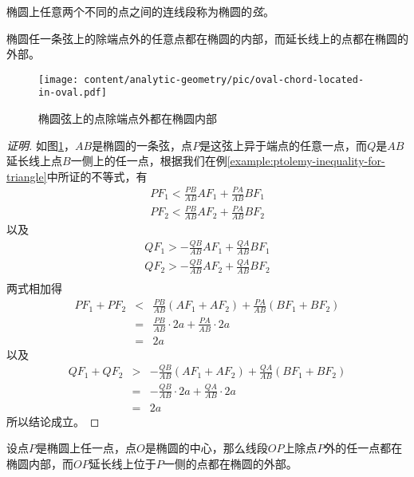 椭圆上任意两个不同的点之间的连线段称为椭圆的\emph{弦}。

\begin{property}
椭圆任一条弦上的除端点外的任意点都在椭圆的内部，而延长线上的点都在椭圆的外部。  
\end{property}

\begin{figure}[htbp]
  \centering
\texttt{[image: content/analytic-geometry/pic/oval-chord-located-in-oval.pdf]}
\caption{椭圆弦上的点除端点外都在椭圆内部}
\label{fig:oval-chord-located-in-oval}
\end{figure}

\begin{proof}[证明]
  如图\ref{fig:oval-chord-located-in-oval}，$AB$是椭圆的一条弦，点$P$是这弦上异于端点的任意一点，而$Q$是$AB$延长线上点$B$一侧上的任一点，根据我们在例\ref{example:ptolemy-inequality-for-triangle}中所证的不等式，有
  \begin{eqnarray*}
   PF_1 < \frac{PB}{AB} AF_1 + \frac{PA}{AB} BF_1 \\
   PF_2 < \frac{PB}{AB} AF_2 + \frac{PA}{AB} BF_2 
  \end{eqnarray*}
  以及
  \begin{eqnarray*}
    QF_1 > - \frac{QB}{AB} AF_1 + \frac{QA}{AB} BF_1 \\
    QF_2 > - \frac{QB}{AB} AF_2 + \frac{QA}{AB} BF_2 \\
  \end{eqnarray*}
  两式相加得
  \begin{eqnarray*}
    PF_1+PF_2 & < & \frac{PB}{AB} (AF_1+AF_2) + \frac{PA}{AB} (BF_1+BF_2) \\
              & = & \frac{PB}{AB} \cdot 2a + \frac{PA}{AB} \cdot 2a \\
    & = & 2a
  \end{eqnarray*}
  以及
  \begin{eqnarray*}
    QF_1+QF_2 & > & -\frac{QB}{AB} (AF_1+AF_2) + \frac{QA}{AB} (BF_1+BF_2) \\
              & = & -\frac{QB}{AB} \cdot 2a + \frac{QA}{AB} \cdot 2a \\
    & = & 2a
  \end{eqnarray*}
  所以结论成立。
\end{proof}

\begin{property}
  设点$P$是椭圆上任一点，点$O$是椭圆的中心，那么线段$OP$上除点$P$外的任一点都在椭圆内部，而$OP$延长线上位于$P$一侧的点都在椭圆的外部。
\end{property}


